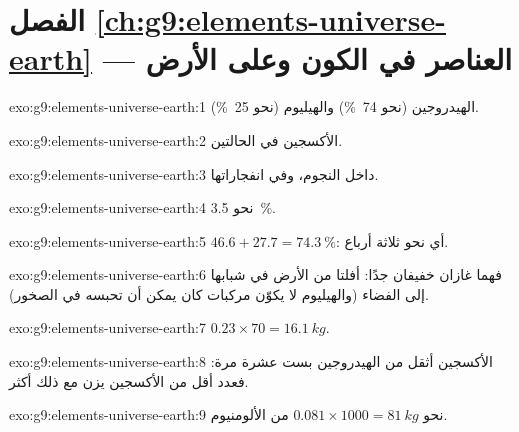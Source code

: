 \section*{الفصل \ref{ch:g9:elements-universe-earth} --- العناصر في الكون وعلى الأرض}

\begin{solution}{exo:g9:elements-universe-earth:1}
الهيدروجين (نحو \qty{74}{\percent}) والهيليوم (نحو
\qty{25}{\percent}).
\end{solution}

\begin{solution}{exo:g9:elements-universe-earth:2}
الأكسجين في الحالتين.
\end{solution}

\begin{solution}{exo:g9:elements-universe-earth:3}
داخل النجوم، وفي انفجاراتها.
\end{solution}

\begin{solution}{exo:g9:elements-universe-earth:4}
نحو \qty{3.5}{\percent}.
\end{solution}

\begin{solution}{exo:g9:elements-universe-earth:5}
$46.6 + 27.7 = \qty{74.3}{\percent}$: أي نحو ثلاثة أرباع.
\end{solution}

\begin{solution}{exo:g9:elements-universe-earth:6}
فهما غازان خفيفان جدًا: أفلتا من الأرض في شبابها إلى الفضاء (والهيليوم لا
يكوّن مركبات كان يمكن أن تحبسه في الصخور).
\end{solution}

\begin{solution}{exo:g9:elements-universe-earth:7}
$0.23 \times 70 = \qty{16.1}{kg}$.
\end{solution}

\begin{solution}{exo:g9:elements-universe-earth:8}
 الأكسجين أثقل من  الهيدروجين بست عشرة مرة: فعدد أقل من 
الأكسجين يزن مع ذلك أكثر.
\end{solution}

\begin{solution}{exo:g9:elements-universe-earth:9}
نحو $0.081 \times 1000 = \qty{81}{kg}$ من الألومنيوم.
\end{solution}

